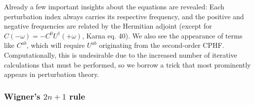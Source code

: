 Already a few important insights about the equations are revealed: Each perturbation index always carries its respective frequency, and the positive and negative frequencies are related by the Hermitian adjoint (except for \(C(-\omega) = -C^{0} U^{\dagger}(+\omega)\), Karna eq. 40).  We also see the appearance of terms like \(C^{ab}\), which will require \(U^{ab}\) originating from the second-order CPHF. Computationally, this is undesirable due to the increased number of iterative calculations that must be performed, so we borrow a trick that most prominently appears in perturbation theory.

\hypertarget{wigners-2n-1-rule}{%
  \subsubsection{\texorpdfstring{Wigner's \(2n + 1\) rule}{Wigner's 2n + 1 rule}}\label{wigners-2n-1-rule}}


